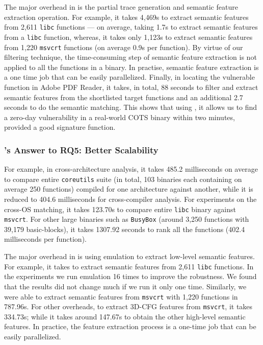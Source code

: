 The major overhead in \tool is the partial trace generation and semantic feature extraction operation. For example, it takes 4,469s to extract semantic features from 2,611 \texttt{libc} functions --- on average, taking 1.7s to extract semantic features from a \texttt{libc} function, whereas, it takes only 1,123s to extract semantic features from 1,220 \texttt{msvcrt} functions (on average 0.9s per function). By virtue of our filtering technique, the time-consuming step of semantic feature extraction is not applied to all the functions in a binary. In practise, semantic feature extraction is a one time job that can be easily parallelized.
Finally, in locating the vulnerable function in Adobe PDF Reader, it takes, in total, 88 seconds to filter and extract semantic features from the shortlisted target functions and an additional 2.7 seconds to do the semantic matching.  This shows that using \tool, it allows us to find  a zero-day vulnerability in a real-world COTS binary within two minutes, provided a good signature function.


\subsubsection{\toolNew's Answer to RQ5: Better Scalability}
For example, in cross-architecture analysis, it takes 485.2 milliseconds on average to compare entire \texttt{coreutils} suite (in total, 103 binaries each containing on average 250 functions) compiled for one architecture against another, while it is reduced to 404.6 milliseconds for cross-compiler analysis. For experiments on the cross-OS matching, it takes 123.70s to compare entire \texttt{libc} binary against \texttt{msvcrt}. For other large binaries such as \texttt{BusyBox} (around 3,250 functions with 39,179 basic-blocks), it takes 1307.92 seconds to rank all the functions (402.4 milliseconds per function).

The major overhead in \toolNew is using emulation to extract low-level semantic features. For example, it takes
 to extract semantic features from 2,611 \texttt{libc} functions. In the experiments we run emulation 16 times to improve the robustness.  We found that the results did not change much if we run it only one time. %
Similarly, we were able to extract semantic features from \texttt{msvcrt} with 1,220 functions in 787.96s. For other overheads, to extract 3D-CFG features from \texttt{msvcrt}, it takes 334.73s; while it takes around 147.67s to obtain the other high-level semantic features. In practice, the feature extraction process is a one-time job that can be easily parallelized.

